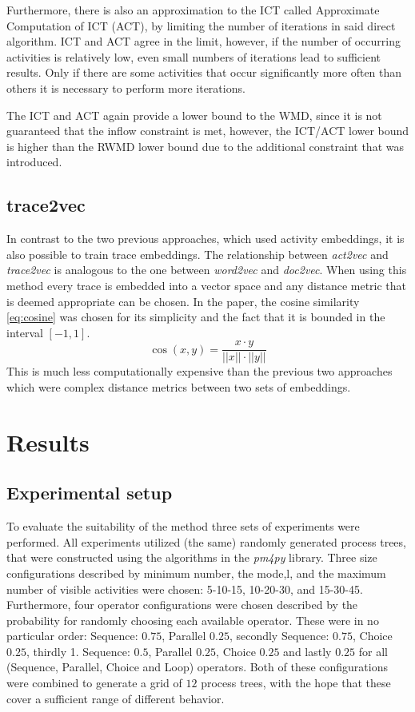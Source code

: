 \documentclass[runningheads]{template/llncs}
\begin{document}
Furthermore, there is also an approximation to the ICT called Approximate Computation of ICT (ACT), by limiting the number of iterations in said direct algorithm.
ICT and ACT agree in the limit, however, if the number of occurring activities is relatively low, even small numbers of iterations lead to sufficient results.
Only if there are some activities that occur significantly more often than others it is necessary to perform more iterations.

The ICT and ACT again provide a lower bound to the WMD, since it is not guaranteed that the inflow constraint is met, however, the ICT/ACT lower bound is higher than the RWMD lower bound due to the additional constraint that was introduced.
\color{black}
\subsection{trace2vec}
In contrast to the two previous approaches, which used activity embeddings, it is also possible to train trace embeddings.
The relationship between \emph{act2vec} and \emph{trace2vec} is analogous to the one between \emph{word2vec} and \emph{doc2vec}.
When using this method every trace is embedded into a vector space and any distance metric that is deemed appropriate can be chosen.
In the paper, the cosine similarity \cref{eq:cosine} was chosen for its simplicity and the fact that it is bounded in the interval $[-1,1]$.
\begin{equation}
	\cos(x,  y) = \frac { x \cdot  y}{|| x|| \cdot || y||}
	\label{eq:cosine}
\end{equation}
This is much less computationally expensive than the previous two approaches which were complex distance metrics between two sets of embeddings.

\section{Results}
\label{sec:results}
\subsection{Experimental setup}

To evaluate the suitability of the method three sets of experiments were performed. 
\color{blue}
All experiments utilized (the same) randomly generated process trees, that were constructed using the algorithms in the \emph{pm4py} library.
Three size configurations described by minimum number, the mode,l, and the maximum number of visible activities were chosen: 5-10-15, 10-20-30, and 15-30-45.
Furthermore, four operator configurations were chosen described by the probability for randomly choosing each available operator.
These were in no particular order: Sequence: $0.75$, Parallel $0.25$, secondly Sequence: $0.75$, Choice $0.25$, thirdly 1. Sequence: $0.5$, Parallel $0.25$, Choice $0.25$ and lastly $0.25$ for all (Sequence, Parallel, Choice and Loop) operators.
Both of these configurations were combined to generate a grid of $12$ process trees, with the hope that these cover a sufficient range of different behavior.
\color{black}
\end{document}
